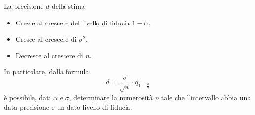\begin{observation}
	La precisione $d$ della stima
	\begin{itemize}
		\item Cresce al crescere del livello di fiducia $1-\alpha$.
		\item Cresce al crescere di $\sigma^2$.
		\item Decresce al crescere di $n$.
	\end{itemize}
	In particolare, dalla formula
	\[ d = \frac{\sigma}{\sqrt{n}} \cdot q_{1 - \frac{\alpha}{2}} \]
	è possibile, dati $\alpha$ e $\sigma$, determinare la numerosità $n$ tale che l'intervallo
	abbia una data precisione e un dato livello di fiducia.
\end{observation}
